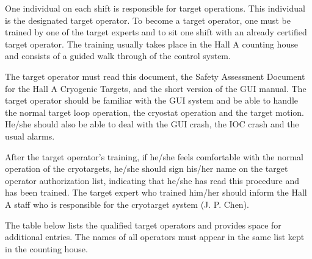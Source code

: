 One individual on each shift is responsible for target operations. 
This individual
is the designated target operator. To become a target operator, 
one must be trained by one of the target experts and to sit 
one shift with an already certified target operator. The training usually 
takes place in the Hall A counting house and consists of a guided walk 
through of the control system. 
\par
The target operator must read this document,
the Safety Assessment Document for the Hall A Cryogenic Targets,
and the short version of the GUI manual. The target operator should
be familiar with the GUI system and be able to handle the normal target
loop operation, the cryostat operation and the target motion. 
He/she should also be able to deal with the GUI crash, the IOC crash
and the usual alarms.
\par
After the target operator's training, if he/she feels comfortable
with the normal operation of the cryotargets, he/she should sign
his/her name on the target operator authorization list, indicating that
he/she has read this procedure and has been trained. The target expert
who trained him/her should inform the Hall A staff who is responsible 
for the cryotarget system (J. P. Chen). 
\par
The table below lists the qualified target operators and provides space 
for additional entries. The names of all
operators must appear in the same list kept in the counting house.

\vspace{0.3cm}

